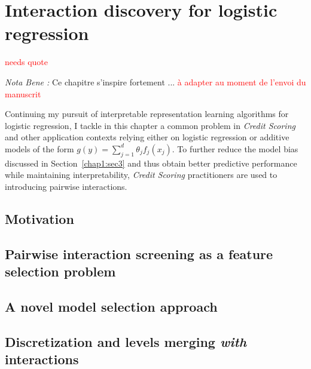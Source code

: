 \chapter{Interaction discovery for logistic regression} \label{chap5}

\textcolor{red}{needs quote}

\textit{Nota Bene :} Ce chapitre s'inspire fortement ... \textcolor{red}{à adapter au moment de l'envoi du manuscrit}


Continuing my pursuit of interpretable representation learning algorithms for logistic regression, I tackle in this chapter a common problem in \textit{Credit Scoring} and other application contexts relying either on logistic regression or additive models of the form $g(y) = \sum_{j=1}^d \theta_j f_j(x_j)$. To further reduce the model bias discussed in Section~\ref{chap1:sec3} and thus obtain better predictive performance while maintaining interpretability, \textit{Credit Scoring} practitioners are used to introducing pairwise interactions.


\section{Motivation}


\section{Pairwise interaction screening as a feature selection problem}


\section{A novel model selection approach}


\section{Discretization and levels merging \textit{with} interactions} \label{sec:discwith}

